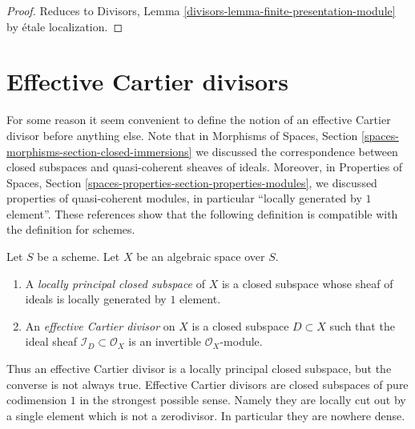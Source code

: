 \begin{proof}
Reduces to
Divisors, Lemma \ref{divisors-lemma-finite-presentation-module}
by \'etale localization.
\end{proof}














\section{Effective Cartier divisors}
\label{section-effective-Cartier-divisors}

\noindent
For some reason it seem convenient to define the notion of an effective
Cartier divisor before anything else. Note that in
Morphisms of Spaces, Section \ref{spaces-morphisms-section-closed-immersions}
we discussed the correspondence between closed subspaces and quasi-coherent
sheaves of ideals. Moreover, in
Properties of Spaces, Section
\ref{spaces-properties-section-properties-modules}, we discussed properties
of quasi-coherent modules, in particular ``locally generated by $1$ element''.
These references show that the following definition is
compatible with the definition for schemes.

\begin{definition}
\label{definition-effective-Cartier-divisor}
Let $S$ be a scheme. Let $X$ be an algebraic space over $S$.
\begin{enumerate}
\item A {\it locally principal closed subspace} of $X$ is a closed subspace
whose sheaf of ideals is locally generated by $1$ element.
\item An {\it effective Cartier divisor} on $X$ is a closed subspace
$D \subset X$ such that the ideal sheaf $\mathcal{I}_D \subset \mathcal{O}_X$
is an invertible $\mathcal{O}_X$-module.
\end{enumerate}
\end{definition}

\noindent
Thus an effective Cartier divisor is a locally principal closed subspace,
but the converse is not always true. Effective Cartier divisors are closed
subspaces of pure codimension $1$ in the strongest possible sense. Namely
they are locally cut out by a single element which is not a zerodivisor.
In particular they are nowhere dense.

